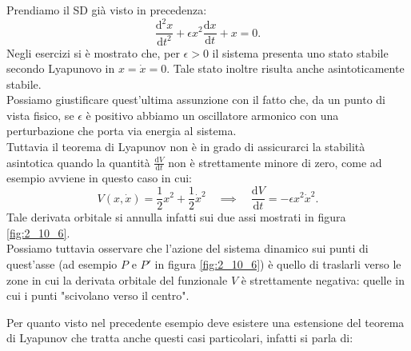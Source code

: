 \noindent
\begin{exmp}
    Prendiamo il SD già visto in precedenza:
    \[
        \frac{\text{d} ^2x}{\text{d} t^2} + \epsilon  x^2\frac{\text{d} x}{\text{d} t} + x = 0 
    .\] 
    Negli esercizi si è mostrato che, per $\epsilon >0$ il sistema presenta uno stato stabile secondo Lyapunovo in $x = \dot{x} = 0$. Tale stato inoltre risulta anche asintoticamente stabile.\\
    Possiamo giustificare quest'ultima assunzione con il fatto che, da un punto di vista fisico, se $\epsilon$ è positivo abbiamo un oscillatore armonico con una perturbazione che porta via energia al sistema.
    \\
    Tuttavia il teorema di Lyapunov non è in grado di assicurarci la stabilità asintotica quando la quantità $\frac{\text{d} V}{\text{d} t}$ non è strettamente minore di zero, come ad esempio avviene in questo caso in cui:
    \[
        V(x,\dot{x}) = \frac{1}{2}x^2 + \frac{1}{2}\dot{x}^2 \quad \implies  \quad
	\frac{\text{d} V}{\text{d} t} = - \epsilon x^2\dot{x}^2
    .\] 
    Tale derivata orbitale si annulla infatti sui due assi mostrati in figura \ref{fig:2_10_6}. \\
    Possiamo tuttavia osservare che l'azione del sistema dinamico sui punti di quest'asse (ad esempio $P$ e $P'$ in figura \ref{fig:2_10_6}) è quello di traslarli verso le zone in cui la derivata orbitale del funzionale $V$ è strettamente negativa: quelle in cui i punti "scivolano verso il centro".
\end{exmp}
\noindent
Per quanto visto nel precedente esempio deve esistere una estensione del teorema di Lyapunov che tratta anche questi casi particolari, infatti si parla di:
